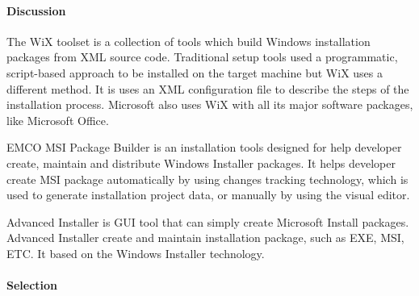 \paragraph{Discussion}


The WiX toolset is a collection of tools which build Windows installation packages from XML source code.
Traditional setup tools used a programmatic, script-based approach to be installed on the target machine but WiX uses a different method.
It is uses an XML configuration file to describe the steps of the installation process.
Microsoft also uses WiX with all its major software packages, like Microsoft Office.
\cite{Wix_tool}


EMCO MSI Package Builder is an installation tools designed for help developer create, maintain and distribute Windows Installer packages.
\cite{EMCO_MSI}
It helps developer create MSI package automatically by using changes tracking technology, which is used to generate installation project data, or manually by using the visual editor.


Advanced Installer is GUI tool that can simply create Microsoft Install packages.
Advanced Installer create and maintain installation package, such as EXE, MSI, ETC.
It based on the Windows Installer technology.
\cite{advanced_install}

\paragraph{Selection}

